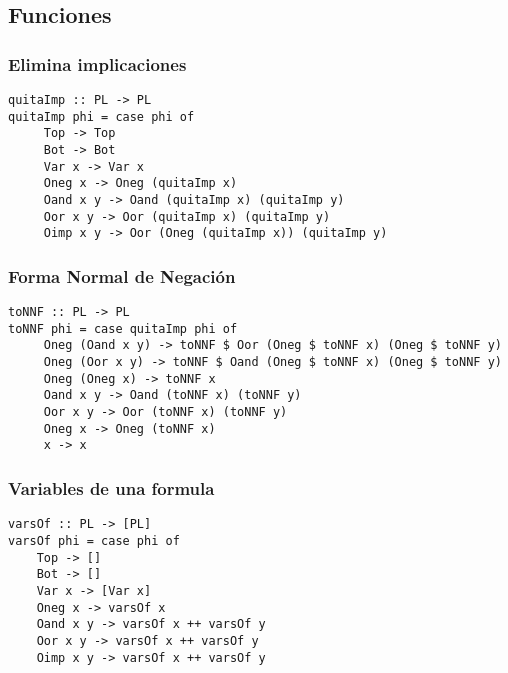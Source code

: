 \documentclass[11pt]{article}
\begin{document}
\subsection{Funciones}
\label{sec:orgdc004a8}
\subsubsection{Elimina implicaciones}
\label{sec:orgffffae7}
\begin{verbatim}
quitaImp :: PL -> PL
quitaImp phi = case phi of
     Top -> Top
     Bot -> Bot
     Var x -> Var x
     Oneg x -> Oneg (quitaImp x)
     Oand x y -> Oand (quitaImp x) (quitaImp y)
     Oor x y -> Oor (quitaImp x) (quitaImp y)
     Oimp x y -> Oor (Oneg (quitaImp x)) (quitaImp y)
\end{verbatim}
\subsubsection{Forma Normal de Negación}
\label{sec:orgff3c985}
\begin{verbatim}
toNNF :: PL -> PL
toNNF phi = case quitaImp phi of
     Oneg (Oand x y) -> toNNF $ Oor (Oneg $ toNNF x) (Oneg $ toNNF y)
     Oneg (Oor x y) -> toNNF $ Oand (Oneg $ toNNF x) (Oneg $ toNNF y)
     Oneg (Oneg x) -> toNNF x
     Oand x y -> Oand (toNNF x) (toNNF y)
     Oor x y -> Oor (toNNF x) (toNNF y)
     Oneg x -> Oneg (toNNF x)
     x -> x
\end{verbatim}
\subsubsection{Variables de una formula}
\label{sec:org60efe3b}
\begin{verbatim}
varsOf :: PL -> [PL]
varsOf phi = case phi of
    Top -> []
    Bot -> []
    Var x -> [Var x]
    Oneg x -> varsOf x
    Oand x y -> varsOf x ++ varsOf y
    Oor x y -> varsOf x ++ varsOf y
    Oimp x y -> varsOf x ++ varsOf y
\end{verbatim}
\end{document}
